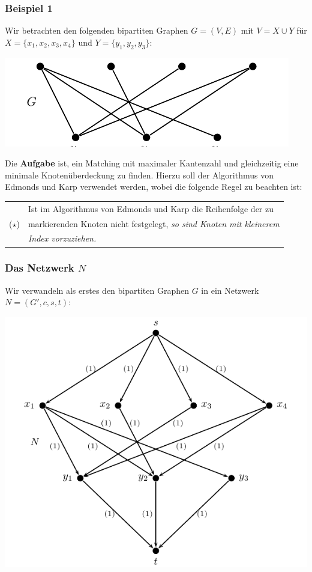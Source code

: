 \documentclass[smaller]{beamer}
\begin{document}
\begin{frame}
 \frametitle{Beispiel 1}
 Wir betrachten den folgenden bipartiten Graphen $G=(V,E)$ mit $V = X \cup Y$ für $X = \big\{ x_1,x_2,x_3,x_4 \big\}$ und $Y = \big\{ y_1,y_2,y_3 \big\}$:

\begin{center}
\includegraphics{fig47.pdf}
\end{center}

Die \textbf{Aufgabe} ist, ein Matching mit maximaler Kantenzahl und gleichzeitig eine minimale Knotenüberdeckung zu finden. Hierzu soll der Algorithmus von Edmonds und Karp verwendet werden, wobei die \alert{folgende Regel} zu beachten ist:
\begin{center}
\begin{tabular}{rl}
& Ist im Algorithmus von Edmonds und Karp die Reihenfolge der zu  \\
($\star$)    & markierenden Knoten nicht festgelegt, \alert{\textit{so sind Knoten mit kleinerem}} \\
    & \alert{\textit{Index vorzuziehen.}}
\end{tabular}
\end{center}
\end{frame}


\begin{frame}
 \frametitle{Das Netzwerk $N$}
 Wir verwandeln als erstes den bipartiten Graphen $G$ in ein Netzwerk $N=(G',c,s,t)$:
 \begin{center}
  \includegraphics[scale = 0.8]{fig48.pdf}
 \end{center}
\end{frame}
\end{document}
